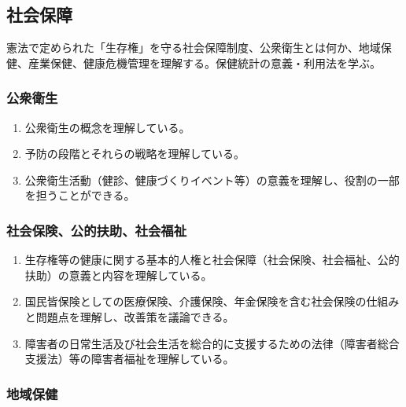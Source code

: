 \documentclass[
]{ltjsarticle}
\providecommand{\tightlist}{%
  \setlength{\itemsep}{0pt}\setlength{\parskip}{0pt}}
\begin{document}
\hypertarget{ux793eux4f1aux4fddux969c}{%
\subsection{社会保障}\label{ux793eux4f1aux4fddux969c}}

憲法で定められた「生存権」を守る社会保障制度、公衆衛生とは何か、地域保健、産業保健、健康危機管理を理解する。保健統計の意義・利用法を学ぶ。

\hypertarget{ux516cux8846ux885bux751f}{%
\subsubsection{公衆衛生}\label{ux516cux8846ux885bux751f}}

\begin{enumerate}
\def\labelenumi{\arabic{enumi}.}
\tightlist
\item
  公衆衛生の概念を理解している。
\item
  予防の段階とそれらの戦略を理解している。
\item
  公衆衛生活動（健診、健康づくりイベント等）の意義を理解し、役割の一部を担うことができる。
\end{enumerate}

\hypertarget{ux793eux4f1aux4fddux967aux516cux7684ux6276ux52a9ux793eux4f1aux798fux7949}{%
\subsubsection{社会保険、公的扶助、社会福祉}\label{ux793eux4f1aux4fddux967aux516cux7684ux6276ux52a9ux793eux4f1aux798fux7949}}

\begin{enumerate}
\def\labelenumi{\arabic{enumi}.}
\tightlist
\item
  生存権等の健康に関する基本的人権と社会保障（社会保険、社会福祉、公的扶助）の意義と内容を理解している。
\item
  国民皆保険としての医療保険、介護保険、年金保険を含む社会保険の仕組みと問題点を理解し、改善策を議論できる。
\item
  障害者の日常生活及び社会生活を総合的に支援するための法律（障害者総合支援法）等の障害者福祉を理解している。
\end{enumerate}

\hypertarget{ux5730ux57dfux4fddux5065}{%
\subsubsection{地域保健}\label{ux5730ux57dfux4fddux5065}}
\end{document}
